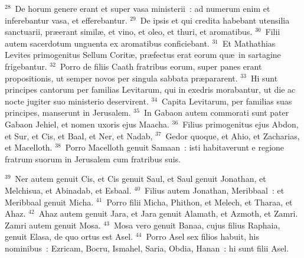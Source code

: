 ${}^{28}$~De horum genere erant et super vasa ministerii~: ad numerum enim et inferebantur vasa, et efferebantur.
${}^{29}$~De ipsis et qui credita habebant utensilia sanctuarii, pr\ae erant simil\ae , et vino, et oleo, et thuri, et aromatibus.
${}^{30}$~Filii autem sacerdotum unguenta ex aromatibus conficiebant.
${}^{31}$~Et Mathathias Levites primogenitus Sellum Corit\ae , pr\ae fectus erat eorum qu\ae\ in sartagine frigebantur.
${}^{32}$~Porro de filiis Caath fratribus eorum, super panes erant propositionis, ut semper novos per singula sabbata pr\ae pararent.
${}^{33}$~Hi sunt principes cantorum per familias Levitarum, qui in exedris morabantur, ut die ac nocte jugiter suo ministerio deservirent.
${}^{34}$~Capita Levitarum, per familias suas principes, manserunt in Jerusalem.
${}^{35}$~In Gabaon autem commorati sunt pater Gabaon Jehiel, et nomen uxoris ejus Maacha.
${}^{36}$~Filius primogenitus ejus Abdon, et Sur, et Cis, et Baal, et Ner, et Nadab,
${}^{37}$~Gedor quoque, et Ahio, et Zacharias, et Macelloth.
${}^{38}$~Porro Macelloth genuit Samaan~: isti habitaverunt e regione fratrum suorum in Jerusalem cum fratribus suis.


${}^{39}$~Ner autem genuit Cis, et Cis genuit Saul, et Saul genuit Jonathan, et Melchisua, et Abinadab, et Esbaal.
${}^{40}$~Filius autem Jonathan, Meribbaal~: et Meribbaal genuit Micha.
${}^{41}$~Porro filii Micha, Phithon, et Melech, et Tharaa, et Ahaz.
${}^{42}$~Ahaz autem genuit Jara, et Jara genuit Alamath, et Azmoth, et Zamri. Zamri autem genuit Mosa.
${}^{43}$~Mosa vero genuit Banaa, cujus filius Raphaia, genuit Elasa, de quo ortus est Asel.
${}^{44}$~Porro Asel sex filios habuit, his nominibus~: Ezricam, Bocru, Ismahel, Saria, Obdia, Hanan~: hi sunt filii Asel.

